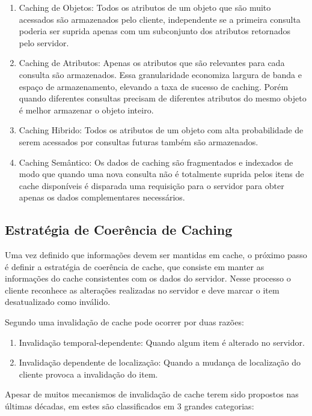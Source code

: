 \documentclass[
	article,			%
	11pt,				%
	oneside,			%
	a4paper,			%
	english,			%
	brazil,				%
	sumario=tradicional
]{abntex2}
\begin{document}
\begin{enumerate}
	\item Caching de Objetos: Todos os atributos de um objeto que são muito acessados são armazenados pelo cliente, independente se a primeira consulta poderia ser suprida apenas com um subconjunto dos atributos retornados pelo servidor.
	
	\item Caching de Atributos: Apenas os atributos que são relevantes para cada consulta são armazenados. Essa granularidade economiza largura de banda e espaço de armazenamento, elevando a taxa de sucesso de caching. Porém quando diferentes consultas precisam de diferentes atributos do mesmo objeto é melhor armazenar o objeto inteiro.
	
	\item Caching Hibrido: Todos os atributos de um objeto com alta probabilidade de serem acessados por consultas futuras também são armazenados.
	
	\item Caching Semântico: Os dados de caching são fragmentados e indexados de modo que quando uma nova consulta não é totalmente suprida pelos itens de cache disponíveis é disparada uma requisição para o servidor para obter apenas os dados complementares necessários.
	
\end{enumerate}

\subsection{Estratégia de Coerência de Caching}
Uma vez definido que informações devem ser mantidas em cache, o próximo passo é definir a estratégia de coerência de cache, que consiste em manter as informações do cache consistentes com os dados do servidor. Nesse processo o cliente reconhece as alterações realizadas no servidor e deve marcar o item desatualizado como inválido.

Segundo \cite{rathore2007overview} uma invalidação de cache pode ocorrer por duas razões:
\begin{enumerate}
	\item Invalidação temporal-dependente:  Quando algum item é alterado no servidor.
	\item Invalidação dependente de localização: Quando a mudança de localização do cliente provoca a invalidação do item.
\end{enumerate}

Apesar de muitos mecanismos de invalidação de cache terem sido propostos nas últimas décadas, em \cite{rathore2007overview} estes são classificados em 3 grandes categorias:
\end{document}
